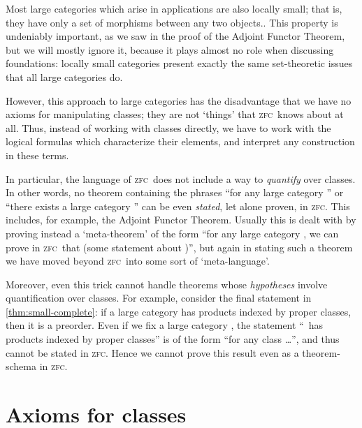 \documentclass{amsart}
\def\zfc{\textsc{zfc}}
\begin{document}
\begin{rmk}
  Most large categories which arise in applications are also locally
  small; that is, they have only a set of morphisms between any two
  objects..  This property is undeniably important, as we saw in the
  proof of the Adjoint Functor Theorem, but we will mostly ignore it,
  because it plays almost no role when discussing foundations: locally
  small categories present exactly the same set-theoretic issues that
  all large categories do.
\end{rmk}

However, this approach to large categories has the disadvantage that
we have no axioms for manipulating classes; they are not `things' that
\zfc\ knows about at all.  Thus, instead of working with classes
directly, we have to work with the logical formulas which characterize
their elements, and interpret any construction in these terms.

In particular, the language of \zfc\ does not include a way to
\emph{quantify} over classes.  In other words, no theorem containing
the phrases ``for any large category \bA'' or ``there exists a large
category \bA'' can be even \emph{stated}, let alone proven, in \zfc.
This includes, for example, the Adjoint Functor Theorem.  Usually this
is dealt with by proving instead a `meta-theorem' of the form ``for
any large category \bA, we can prove in \zfc\ that (some statement about
\bA)'', but again in stating such a theorem we have moved beyond \zfc\
into some sort of `meta-language'.

Moreover, even this trick cannot handle theorems whose
\emph{hypotheses} involve quantification over classes.  For example,
consider the final statement in \autoref{thm:small-complete}: if a
large category has products indexed by proper classes, then it is a
preorder.  Even if we fix a large category \bA, the statement ``\bA\
has products indexed by proper classes'' is of the form ``for any
class \dots'', and thus cannot be stated in \zfc.  Hence we cannot
prove this result even as a theorem-schema in \zfc.


\section{Axioms for classes}
\label{sec:nbg}
\end{document}
